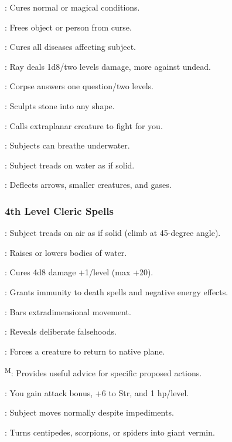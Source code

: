 : Cures normal or magical conditions.

: Frees object or person from curse.

: Cures all diseases affecting subject.

: Ray deals 1d8/two levels damage, more against undead.

: Corpse answers one question/two levels.

: Sculpts stone into any shape.

: Calls extraplanar creature to fight for you.

: Subjects can breathe underwater.

: Subject treads on water as if solid.

: Deflects arrows, smaller creatures, and gases.

\subsubsection{4th Level Cleric Spells}

: Subject treads on air as if solid (climb at 45-degree angle).

: Raises or lowers bodies of water.

: Cures 4d8 damage +1/level (max +20).

: Grants immunity to death spells and negative energy effects.

: Bars extradimensional movement.

: Reveals deliberate falsehoods.

: Forces a creature to return to native plane.

\textsuperscript{M}: Provides useful advice for specific proposed actions.

: You gain attack bonus, +6 to Str, and 1 hp/level.

: Subject moves normally despite impediments.

: Turns centipedes, scorpions, or spiders into giant vermin.

